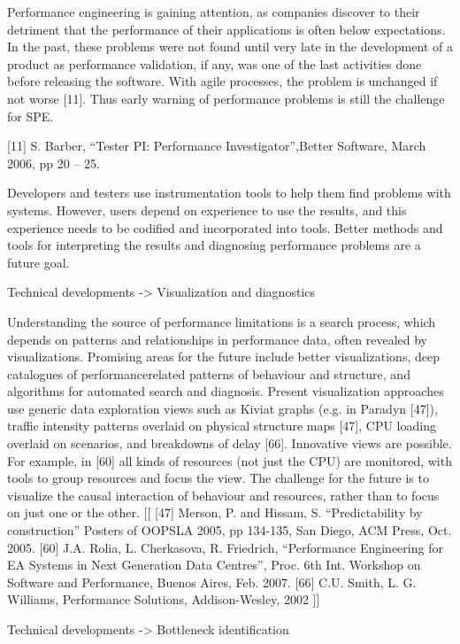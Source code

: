 \documentclass[runningheads,a4paper]{llncs}
\begin{document}
Performance engineering is gaining attention, as companies discover to their
detriment that the performance of their applications is often below
expectations. In the past, these problems were not found until very late in the
development of a product as performance validation, if any, was one of the last
activities done before releasing the software. With agile processes, the problem
is unchanged if not worse [11]. Thus early warning of performance problems is
still the challenge for SPE.

[11] S. Barber, “Tester PI: Performance Investigator”,Better Software, March 2006, pp 20 – 25.

Developers and testers use instrumentation tools to help them find problems with
systems. However, users depend on experience to use the results, and this
experience needs to be codified and incorporated into tools. Better methods and
tools for interpreting the results and diagnosing performance problems are a
future goal.

Technical developments -> Visualization and diagnostics

Understanding the source of performance limitations is a search process, which
depends on patterns and relationships in performance data, often revealed by
visualizations. Promising areas for the future include better visualizations,
deep catalogues of performancerelated patterns of behaviour and structure, and
algorithms for automated search and diagnosis.
Present visualization approaches use generic data exploration views such as
Kiviat graphs (e.g. in Paradyn [47]), traffic intensity patterns overlaid on
physical structure maps [47], CPU loading overlaid on scenarios, and breakdowns
of delay [66]. Innovative views are possible. For example, in [60] all kinds of
resources (not just the CPU) are monitored, with tools to group resources and
focus the view. The challenge for the future is to visualize the causal interaction of
behaviour and resources, rather than to focus on just one or the other.
[[
[47] Merson, P. and Hissam, S. “Predictability by construction” Posters of
OOPSLA 2005, pp 134-135, San Diego, ACM Press, Oct. 2005.
[60] J.A. Rolia, L. Cherkasova, R. Friedrich, “Performance Engineering for EA
Systems in Next Generation Data Centres”, Proc. 6th Int. Workshop on Software and
Performance, Buenos Aires, Feb. 2007.
[66] C.U. Smith, L. G. Williams, Performance Solutions, Addison-Wesley, 2002
]]

Technical developments -> Bottleneck identification
\end{document}
